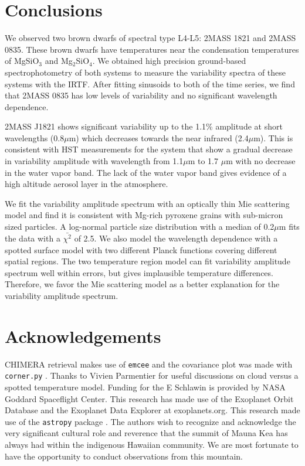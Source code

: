 \documentclass[twocolumn]{aastex6}
\begin{document}
\section{Conclusions}\label{sec:conclusions}

We observed two brown dwarfs of spectral type L4-L5: 2MASS 1821 and 2MASS 0835.
These brown dwarfs have temperatures near the condensation temperatures of MgSiO$_3$ and Mg$_2$SiO$_4$.
We obtained high precision ground-based spectrophotometry of both systems to measure the variability spectra of these systems with the IRTF.
After fitting sinusoids to both of the time series, we find that 2MASS 0835 has low levels of variability and no significant wavelength dependence.

2MASS J1821 shows significant variability up to the 1.1\% amplitude at short wavelengths (0.8$\mu$m) which decreases towards the near infrared (2.4$\mu$m).
This is consistent with HST measurements for the system that show a gradual decrease in variability amplitude with wavelength \citep{2016ApJ...826....8Y} from 1.1$\mu$m to 1.7 $\mu$m with no decrease in the water vapor band.
The lack of the water vapor band gives evidence of a high altitude aerosol layer in the atmosphere.

We fit the variability amplitude spectrum with an optically thin Mie scattering model and find it is consistent with Mg-rich pyroxene grains with sub-micron sized particles.
A log-normal particle size distribution with a median of 0.2$\mu$m fits the data with a $\bar{\chi^2}$ of 2.5.
We also model the wavelength dependence with a spotted surface model with two different Planck functions covering different spatial regions.
The two temperature region model can fit variability amplitude spectrum well within errors, but gives implausible temperature differences.
Therefore, we favor the Mie scattering model as a better explanation for the variability amplitude spectrum.

\section{Acknowledgements}
CHIMERA retrieval makes use of \texttt{emcee} \citep{foreman-mackey2013emcee} and the covariance plot was made with \texttt{corner.py} \citep{foremanCorner}.
Thanks to Vivien Parmentier for useful discussions on cloud versus a spotted temperature model.
Funding for the E Schlawin is provided by NASA Goddard Spaceflight Center.
This research has made use of the Exoplanet Orbit Database and the Exoplanet Data Explorer at exoplanets.org.
This research made use of the \texttt{astropy} package \citep{astropy2013}. The authors wish to recognize and acknowledge the very significant cultural role and reverence that the summit of Mauna Kea has always had within the indigenous Hawaiian community. We are most fortunate to have the opportunity to conduct observations from this mountain.
\end{document}
